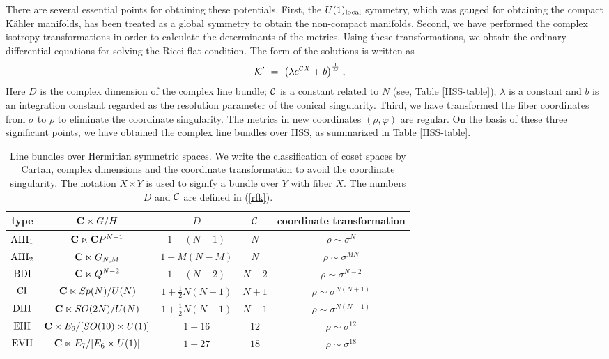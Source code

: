 \documentclass[a4paper,11pt]{article}
\newcommand{\half}{\frac{1}{2}}
\newcommand{\kahler}{K\"{a}hler }
\begin{document}
{There are several essential points for obtaining these potentials.
First, 
the $U(1)_{\rm local}$ symmetry, which was gauged for
obtaining the compact \kahler manifolds,
has been treated as a global symmetry 
to obtain the non-compact manifolds. 
Second,
we have performed the complex isotropy transformations 
in order to calculate the determinants of the metrics.
Using these transformations, 
we obtain the ordinary differential
equations for solving the Ricci-flat condition.
The form of the solutions is written as 
\begin{align}
{\cal K}' \ &= \ \big( \lambda e^{{\cal C} X} + b \big)^{\frac{1}{D}}
\; , \label{rfk}
\end{align}
Here $D$ is the complex dimension of the complex line bundle;
${\cal C}$ is a constant related to $N$ (see, Table \ref{HSS-table});
$\lambda$ is a constant and 
$b$ is an integration constant regarded as the resolution parameter
of the conical singularity.
Third,
we have transformed the fiber coordinates from $\sigma$ to $\rho$
to eliminate the coordinate singularity.
The metrics in new coordinates $(\rho, \varphi)$ are regular. 
On the basis of these three significant points,
we have obtained the complex line bundles over HSS, 
as summarized in Table \ref{HSS-table}.


\begin{table}[h]
\begin{center}
\begin{tabular}{c|c|c|c|c} 
type & ${\bf C} \ltimes G/H$ & $D$ & ${\cal C}$
& coordinate transformation \\ \hline\hline 
${\rm AIII}_1$ & ${\bf C} \ltimes {\bf C}P^{N-1}$ & $1 + (N-1)$ 
& $N$
& $\rho \sim \sigma^N$ \\
${\rm AIII}_2$ & ${\bf C} \ltimes G_{N,M}$ & $1 + M(N-M)$ 
& $N$
& $\rho \sim \sigma^{MN}$ \\
${\rm BDI}$ & ${\bf C} \ltimes Q^{N-2}$ & $1 + (N-2)$ 
& $N-2$
& $\rho \sim \sigma^{N-2}$ \\
${\rm CI}$ & ${\bf C} \ltimes Sp(N) / U(N)$ 
& $1 + \half N(N+1)$ 
& $N+1$
& $\rho \sim \sigma^{N(N+1)}$ \\
${\rm DIII}$ & ${\bf C} \ltimes SO(2N) / U(N)$ 
& $1 + \half N(N-1)$ 
& $N-1$
& $\rho \sim \sigma^{N(N-1)}$ \\
${\rm EIII}$ & ${\bf C} \ltimes E_6 / [SO(10) \times U(1)]$ 
& $1 + 16$ 
& $12$
& $\rho \sim \sigma^{12}$ \\
${\rm EVII}$ & ${\bf C} \ltimes E_7 / [E_6 \times U(1)]$ 
& $1 + 27$ 
& $18$
& $\rho \sim \sigma^{18}$ \\ \hline
\end{tabular}
\caption{Line bundles over Hermitian symmetric spaces.
We write the classification of coset spaces by Cartan, 
complex dimensions and the coordinate transformation to 
avoid the coordinate singularity. 
The notation $X \ltimes Y$ is used to signify a bundle over $Y$ with
fiber $X$.
The numbers $D$ and ${\cal C}$ are defined in (\ref{rfk}).}


\end{center}
\end{table}}
\end{document}
